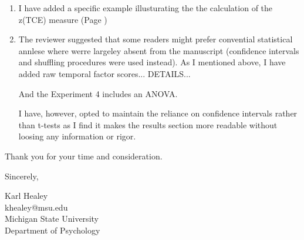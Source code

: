 \documentclass[12pt]{article}
\begin{document}
\begin{enumerate}
	\item
	I have added a specific example illusturating the the calculation of the z(TCE) measure  (Page \pageref{TODO-15})

	\item
	The reviewer suggested that some readers might prefer convential statistical annlese where werre largeley absent from the manuscript (confidence intervals and shuffling procedures were used instead). As I mentioned above, I have added raw temporal factor scores... DETAILS... 

	And the Experiment 4 includes an ANOVA.

	I have, however, opted to maintain the reliance on confidence intervals rather than t-tests as I find it makes the results section more readable without loosing any information or rigor. 



	

\end{enumerate}





\vspace{20pt}

Thank you for your time and consideration.

\vspace{10pt}

Sincerely,

\vspace{10pt}

Karl Healey\\
khealey@msu.edu\\
Michigan State University\\
Department of Psychology

%
\end{document}
